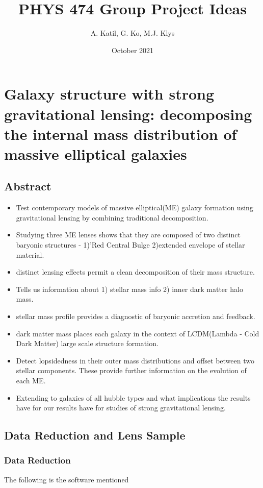 \documentclass{article}
\title{PHYS 474 Group Project Ideas}
\author{A. Katil, G. Ko, M.J. Klys}
\date{October 2021}
\begin{document}
\maketitle

\tableofcontents

\section{Galaxy structure with strong gravitational lensing: decomposing the internal mass distribution of massive elliptical galaxies}

\subsection{Abstract}
\begin{itemize}
    \item Test contemporary models of massive elliptical(ME) galaxy formation using gravitational lensing by combining traditional decomposition. 
    \item Studying three ME lenses shows that they are composed of two distinct baryonic structures - 1)'Red Central Bulge 2)extended envelope of stellar material.
    \item distinct lensing effects permit a clean decomposition of their mass structure.
    \item Tells us information about 1) stellar mass info 2) inner dark matter halo mass.
    \item stellar mass profile  provides a diagnostic of baryonic accretion and feedback.
    \item dark matter mass places each galaxy in the context of LCDM(Lambda - Cold Dark Matter) large scale structure formation.
    \item Detect lopsidedness in their outer mass distributions and offset between two stellar components. These provide further information on the evolution of each ME.
    \item Extending to galaxies of all hubble types and what implications the results have for our results have for studies of strong gravitational lensing.
\end{itemize}


\subsection{Data Reduction and Lens Sample}
\subsubsection{Data Reduction}
The following is the software mentioned
\end{document}
